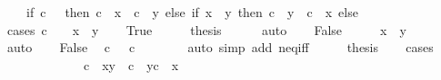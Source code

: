 \begin{isabellebody}
\ \ \ \ {\isacharparenleft}{\kern0pt}if\ c\ {\isachargreater}{\kern0pt}\ {}\ then\ {\isacharbraceleft}{\kern0pt}c\ {\isacharasterisk}{\kern0pt}\ x\ {\isachardot}{\kern0pt}{\isachardot}{\kern0pt}\ c\ {\isacharasterisk}{\kern0pt}\ y{\isacharbraceright}{\kern0pt}\ else\ if\ x\ {\isasymle}\ y\ then\ {\isacharbraceleft}{\kern0pt}c\ {\isacharasterisk}{\kern0pt}\ y\ {\isachardot}{\kern0pt}{\isachardot}{\kern0pt}\ c\ {\isacharasterisk}{\kern0pt}\ x{\isacharbraceright}{\kern0pt}\ else\ {\isacharbraceleft}{\kern0pt}{\isacharbraceright}{\kern0pt}{\isacharparenright}{\kern0pt}{\isachardoublequoteclose}\isanewline
%
\isadelimproof
%
\endisadelimproof
%
\isatagproof
{}\isamarkupfalse%
\ {\isacharparenleft}{\kern0pt}cases\ {\isachardoublequoteopen}c\ {\isacharequal}{\kern0pt}\ {}\ {\isasymor}\ x\ {\isachargreater}{\kern0pt}\ y{\isachardoublequoteclose}{\isacharparenright}{\kern0pt}\isanewline
\ \ \isamarkupfalse%
\ True\isanewline
\ \ \isamarkupfalse%
\ \isamarkupfalse%
\ {\isacharquery}{\kern0pt}thesis\isanewline
\ \ \ \ \isamarkupfalse%
\ auto\isanewline
{}\isamarkupfalse%
\isanewline
\ \ \isamarkupfalse%
\ False\isanewline
\ \ \isamarkupfalse%
\ \isamarkupfalse%
\ {\isachardoublequoteopen}x\ {\isasymle}\ y{\isachardoublequoteclose}\isanewline
\ \ \ \ \isamarkupfalse%
\ auto\isanewline
\ \ \isamarkupfalse%
\ False\ \isamarkupfalse%
\ {\isachardoublequoteopen}c\ {\isacharless}{\kern0pt}\ {}{\isachardoublequoteclose}{\isacharbar}{\kern0pt}\ {\isachardoublequoteopen}c\ {\isachargreater}{\kern0pt}\ {}{\isachardoublequoteclose}\isanewline
\ \ \ \ \isamarkupfalse%
\ {\isacharparenleft}{\kern0pt}auto\ simp\ add{\isacharcolon}{\kern0pt}\ neq{\isacharunderscore}{\kern0pt}iff{\isacharparenright}{\kern0pt}\isanewline
\ \ \isamarkupfalse%
\ \isamarkupfalse%
\ {\isacharquery}{\kern0pt}thesis\isanewline
\ \ \isamarkupfalse%
\ cases\isanewline
\ \ \ \ \isamarkupfalse%
\ {}\isanewline
\ \ \ \ \isamarkupfalse%
\ {\isachardoublequoteopen}{\isacharparenleft}{\kern0pt}{\isacharasterisk}{\kern0pt}{\isacharparenright}{\kern0pt}\ c\ {\isacharbackquote}{\kern0pt}\ {\isacharbraceleft}{\kern0pt}x{\isachardot}{\kern0pt}{\isachardot}{\kern0pt}y{\isacharbraceright}{\kern0pt}\ {\isacharequal}{\kern0pt}\ {\isacharbraceleft}{\kern0pt}c\ {\isacharasterisk}{\kern0pt}\ y{\isachardot}{\kern0pt}{\isachardot}{\kern0pt}c\ {\isacharasterisk}{\kern0pt}\ x{\isacharbraceright}{\kern0pt}{\isachardoublequoteclose}\isanewline

\end{isabellebody}

